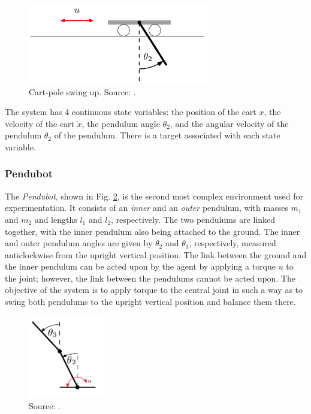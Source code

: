 \begin{figure}[htbp]
\centering    
\includegraphics[width=0.7\textwidth]{Chapter3/Figures/cart-pole.png}
\caption[Cart-pole PILCO environment]{Cart-pole swing up. Source: \cite{deisenroth2013pilco-documentation}.}
\label{Fig:cartpole-environment}
\end{figure}
The system has 4 continuous state variables: the position of the cart $x$, the velocity of the cart $\dot x$, the pendulum angle $\theta_2$, and the angular velocity of the pendulum $\dot \theta_2$ of the pendulum. There is a target associated with each state variable.

\subsubsection{Pendubot}
The \textit{Pendubot}, shown in Fig. \ref{Fig:pendubot-environment}, is the second most complex environment used for experimentation. It consists of an \textit{inner} and an \textit{outer} pendulum, with masses $m_1$ and $m_2$ and lengths $l_1$ and $l_2$, respectively. The two pendulums are linked together, with the inner pendulum also being attached to the ground. The inner and outer pendulum angles are given by $\theta_2$ and $\theta_3$, respectively, measured anticlockwise from the upright vertical position. The link between the ground and the inner pendulum can be acted upon by the agent by applying a torque $u$ to the joint; however, the link between the pendulums cannot be acted upon. The objective of the system is to apply torque to the central joint in such a way as to swing both pendulums to the upright vertical position and balance them there.
\begin{figure}[htbp]
\centering    
\includegraphics[width=0.3\textwidth]{Chapter3/Figures/pendubot.png}
\caption[Pendubot PILCO environment]{Source: \cite{deisenroth2013pilco-documentation}.}
\label{Fig:pendubot-environment}
\end{figure}

